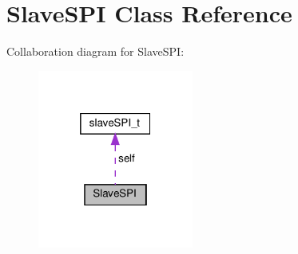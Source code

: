 \hypertarget{classSlaveSPI}{}\section{Slave\+S\+PI Class Reference}
\label{classSlaveSPI}


Collaboration diagram for Slave\+S\+PI\+:\nopagebreak
\begin{figure}[H]
\begin{center}
\leavevmode
\includegraphics[width=145pt]{classSlaveSPI__coll__graph}
\end{center}
\end{figure}
